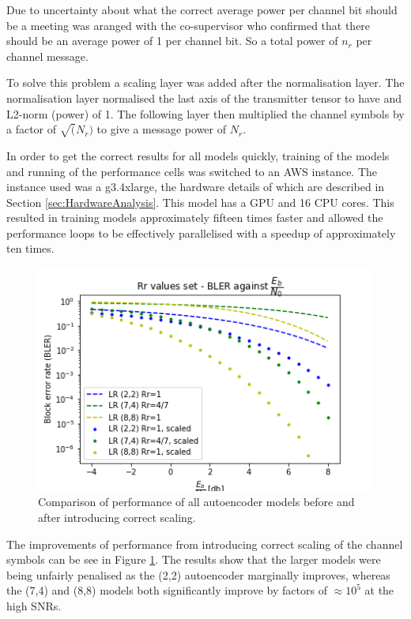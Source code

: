 \documentclass[12pt,onecolumn,letterpaper]{article}
\newcommand\genfigsize{0.5}
\begin{document}
Due to uncertainty about what the correct average power per channel bit should be a meeting was aranged with the co-supervisor who confirmed that there should be an average power of 1 per channel bit. So a total power of $n_r$ per channel message. 

To solve this problem a scaling layer was added after the normalisation layer. The normalisation layer normalised the last axis of the transmitter tensor to have and L2-norm (power) of 1. The following layer then multiplied the channel symbols by a factor of $\sqrt(N_r)$ to give a message power of $N_r$. 

In order to get the correct results for all models quickly, training of the models and running of the performance cells was switched to an AWS instance. The instance used was a g3.4xlarge, the hardware details of which are described in Section \ref{sec:HardwareAnalysis}. This model has a GPU and 16 CPU cores. This resulted in training models approximately fifteen times faster and allowed the performance loops to be effectively parallelised with a speedup of approximately ten times. 

\begin{figure}[t]
   \centering
   \includegraphics[width=\genfigsize\linewidth]{figures/autoencoders_correct_scaling_comparison.png}
   \caption{Comparison of performance of all autoencoder models before and after introducing correct scaling.}
   \label{fig:AutoencodersAllScalingComp}
\end{figure}

The improvements of performance from introducing correct scaling of the channel symbols can be see in Figure \ref{fig:AutoencodersAllScalingComp}. The results show that the larger models were being unfairly penalised as the (2,2) autoencoder marginally improves, whereas the (7,4) and (8,8) models both significantly improve by factors of $\approx 10^5$ at the high SNRs. 
\end{document}
